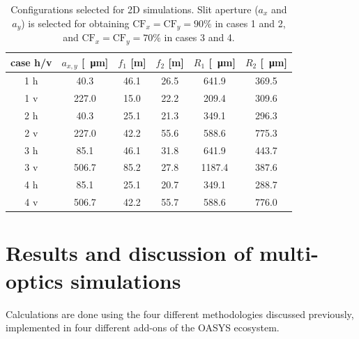 \documentclass{iucr}
\begin{document}
\begin{table}[]
    \label{table:2Dusercases}
    \caption{Configurations selected for 2D simulations. Slit aperture ($a_x$ and $a_y$) is selected for obtaining $\text{CF}_{x}=\text{CF}_{y}=90\%$ in cases 1 and 2, and $\text{CF}_{x}=\text{CF}_{y}=70\%$ in cases 3 and 4. 
    }
    \begin{tabular}{c|c|c|c|c|c}
         case h/v & $a_{x,y}$ [\SI{}{\micro\meter}] & $f_1$ [m] & $f_2$ [m] & $R_1$ [\SI{}{\micro\meter}]& $R_2$ [\SI{}{\micro\meter}] \\
         \hline
1 h &      40.3 & 46.1 &     26.5 &     641.9 &     369.5 
\\
1 v &      227.0 & 15.0 &     22.2 &     209.4 &     309.6 
\\
\hline
2 h &      40.3 & 25.1 &     21.3 &     349.1 &     296.3  
\\
2 v &      227.0 & 42.2 &     55.6 &     588.6 &     775.3 
\\
\hline \hline
3 h &      85.1 & 46.1 &     31.8 &     641.9 &     443.7 
\\
3 v &      506.7 & 85.2 &     27.8 &     1187.4 &     387.6  
\\
\hline
4 h &      85.1 & 25.1 &     20.7 &     349.1 &     288.7 
\\
4 v &      506.7 & 42.2 &     55.7 &     588.6 &     776.0 

    \end{tabular}
\end{table}


\section{Results and discussion of multi-optics simulations}
\label{sec:complete-beamline}

Calculations are done using the four different methodologies discussed previously, implemented in four different add-ons of the OASYS ecosystem. 
\end{document}
